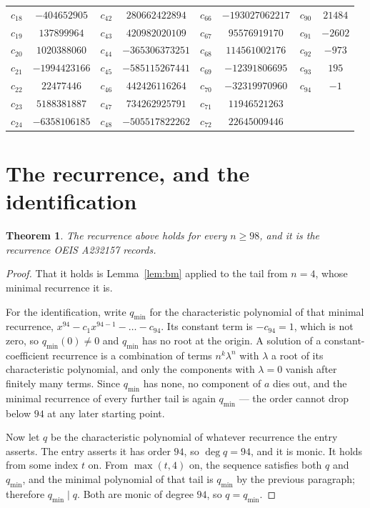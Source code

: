 \documentclass[11pt,a4paper]{article}
\theoremstyle{plain}
\newtheorem{theorem}{Theorem}
\theoremstyle{definition}
\begin{document}
\begin{center}
\begin{tabular}{cccccccc}
$c_{18}$ & $-404652905$ & $c_{42}$ & $280662422894$ & $c_{66}$ & $-193027062217$ & $c_{90}$ & $21484$ \\
$c_{19}$ & $137899964$ & $c_{43}$ & $420982020109$ & $c_{67}$ & $95576919170$ & $c_{91}$ & $-2602$ \\
$c_{20}$ & $1020388060$ & $c_{44}$ & $-365306373251$ & $c_{68}$ & $114561002176$ & $c_{92}$ & $-973$ \\
$c_{21}$ & $-1994423166$ & $c_{45}$ & $-585115267441$ & $c_{69}$ & $-12391806695$ & $c_{93}$ & $195$ \\
$c_{22}$ & $22477446$ & $c_{46}$ & $442426116264$ & $c_{70}$ & $-32319970960$ & $c_{94}$ & $-1$ \\
$c_{23}$ & $5188381887$ & $c_{47}$ & $734262925791$ & $c_{71}$ & $11946521263$ &  &  \\
$c_{24}$ & $-6358106185$ & $c_{48}$ & $-505517822262$ & $c_{72}$ & $22645009446$ &  &  \\
\end{tabular}
\end{center}

\section{The recurrence, and the identification}

\begin{theorem}
The recurrence above holds for every $n\ge98$, and it is the recurrence OEIS A232157 records.
\end{theorem}

\begin{proof}
That it holds is Lemma~\ref{lem:bm} applied to the tail from $n=4$, whose minimal
recurrence it is.

For the identification, write $q_{\min}$ for the characteristic polynomial of that minimal
recurrence, $x^{94}-c_1x^{94-1}-\dots-c_{94}$. Its constant term is
$-c_{94}=1$, which is not zero, so $q_{\min}(0)\neq0$ and $q_{\min}$ has no
root at the origin. A solution of a constant-coefficient recurrence is a combination of terms
$n^{k}\lambda^{n}$ with $\lambda$ a root of its characteristic polynomial, and only the
components with $\lambda=0$ vanish after finitely many terms. Since $q_{\min}$ has none, no
component of $a$ dies out, and the minimal recurrence of every further tail is again
$q_{\min}$ --- the order cannot drop below $94$ at any later starting point.

Now let $q$ be the characteristic polynomial of whatever recurrence the entry asserts. The
entry asserts it has order $94$, so $\deg q=94$, and it is monic. It holds from some
index $t$ on. From $\max(t,4)$ on, the sequence satisfies both $q$ and $q_{\min}$, and
the minimal polynomial of that tail is $q_{\min}$ by the previous paragraph; therefore
$q_{\min}\mid q$. Both are monic of degree $94$, so $q=q_{\min}$.
\end{proof}
\end{document}
